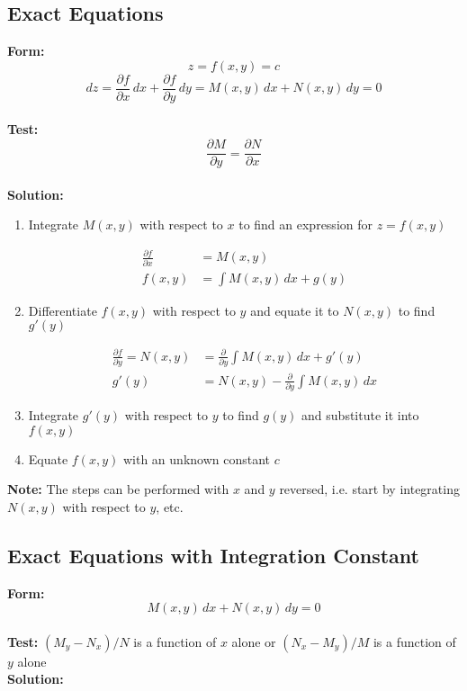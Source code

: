 \documentclass{article}
\begin{document}
\subsection{Exact Equations}

\textbf{Form:} \[z = f(x, y) = c\] \[dz = \frac{\partial f}{\partial x} \,d x + \frac{\partial f}{\partial y} \,d y = M(x, y) \,d x + N(x, y) \,d y = 0\] \\ \textbf{Test:} \[\frac{\partial M}{\partial y} = \frac{\partial N}{\partial x}\] \\ \textbf{Solution:} \begin{enumerate}
  \item Integrate $M(x, y)$ with respect to $x$ to find an expression for $z = f(x, y)$

        \begin{align*}
          \frac{\partial f}{\partial x} & = M(x, y)                   \\
          f(x, y)                       & = \int M(x, y) \,d x + g(y)
        \end{align*}

  \item Differentiate $f(x, y)$ with respect to $y$ and equate it to $N(x, y)$ to find $g'(y)$

        \begin{align*}
          \frac{\partial f}{\partial y} = N(x, y) & = \frac{\partial}{\partial y} \int M(x, y) \,d x + g'(y)   \\
          g'(y)                                   & = N(x, y) - \frac{\partial}{\partial y} \int M(x, y) \,d x
        \end{align*}

  \item Integrate $g'(y)$ with respect to $y$ to find $g(y)$ and substitute it into $f(x, y)$

  \item Equate $f(x, y)$ with an unknown constant $c$
\end{enumerate} \textbf{Note:} The steps can be performed with $x$ and $y$ reversed, i.e. start by integrating $N(x, y)$ with respect to $y$, etc.

\subsection{Exact Equations with Integration Constant}

\textbf{Form:} \[M(x, y) \,d x + N(x, y) \,d y = 0\] \\ \textbf{Test:} $(M_y - N_x) / N$ is a function of $x$ alone or $(N_x - M_y) / M$ is a function of $y$ alone \\ \textbf{Solution:}
\end{document}
